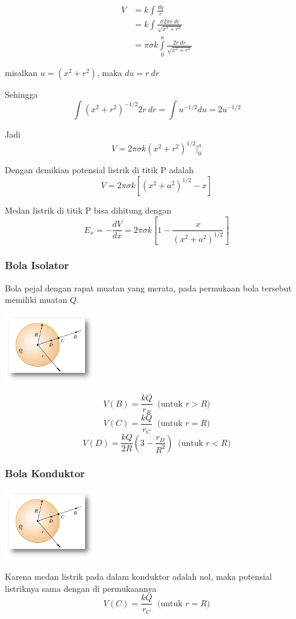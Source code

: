 \documentclass[twocolumn, 11pt]{article}%
\begin{document}
     \begin{align*}
         V&=k\int\frac{dq}r\\
          &=k\int\frac{\sigma2\pi r\ dr}{\sqrt{x^2+r^2}}\\
          &= \pi\sigma k\int\limits_0^a \frac{2r\ dr}{\sqrt{x^2+r^2}}
     \end{align*}
     
     misalkan $\displaystyle u=(x^2+r^2)$, maka $du=r\ dr$

     Sehingga
     \[ \int(x^2+r^2)^{-1/2} 2r\ dr = \int u^{-1/2}du=2u^{-1/2}\]

     Jadi
     \[V=2\pi\sigma k(x^2+r^2)^{1/2}\bigg|_0^a \]

     Dengan demikian potensial listrik di titik P adalah
     \[ V=2\pi\sigma k \left[(x^2+a^2)^{1/2}-x \right] \]

     Medan listrik di titik P bisa dihitung dengan
     \[E_x=-\frac{dV}{dx}=2\pi\sigma k\left[1-\frac{x}{(x^2+a^2)^{1/2}}\right] \]

     \subsubsection{Bola Isolator}%
     Bola pejal dengan rapat muatan yang merata, pada permukaan bola tersebut memiliki muatan $Q$.
     \begin{center}
         \includegraphics[width=150px]{14.png}
     \end{center}
 \[V(B)=\frac{kQ}{r_B}\ \text{ (untuk }r>R) \]
 \[V(C)=\frac{kQ}{r_C}\ \text{ (untuk }r=R) \]
 \[V(D)=\frac{kQ}{2R} \left(3-\frac{r_D}{R^2}\right)\ \text{ (untuk }r<R) \]
     
    \subsubsection{Bola Konduktor}%
     \begin{center}
         \includegraphics[width=150px]{14.png}
     \end{center}
    Karena medan listrik pada dalam konduktor adalah nol, maka potensial listriknya sama dengan di permukaannya
 \[V(C)=\frac{kQ}{r_C}\ \text{ (untuk }r=R) \]
    
\end{document}
